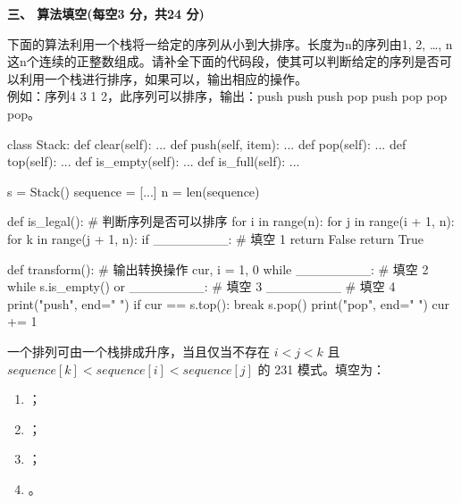 \textbf{三、 算法填空(每空3 分，共24 分)}
\begin{question}
下面的算法利用一个栈将一给定的序列从小到大排序。长度为n的序列由1, 2, …, n这n个连续的正整数组成。请补全下面的代码段，使其可以判断给定的序列是否可以利用一个栈进行排序，如果可以，输出相应的操作。\\
例如：序列4 3 1 2，此序列可以排序，输出：push push push pop push pop pop pop。\\
\begin{pycode}
class Stack:
    def clear(self): ...
    def push(self, item): ...
    def pop(self): ...
    def top(self): ...
    def is_empty(self): ...
    def is_full(self): ...


s = Stack()
sequence = [...]
n = len(sequence)


def is_legal():
    # 判断序列是否可以排序
    for i in range(n):
        for j in range(i + 1, n):
            for k in range(j + 1, n):
                if ________:       # 填空 1
                    return False
    return True


def transform():
    # 输出转换操作
    cur, i = 1, 0
    while ________:                # 填空 2
        while s.is_empty() or ________:    # 填空 3
            ________               # 填空 4
            print("push", end=" ")
            if cur == s.top():
                break
        s.pop()
        print("pop", end=" ")
        cur += 1
\end{pycode}
\begin{solution}
一个排列可由一个栈排成升序，当且仅当不存在 $i<j<k$ 且 $sequence[k]<sequence[i]<sequence[j]$ 的 231 模式。填空为：
  \begin{enumerate}[leftmargin=2em]
    \item \texttt{}；
    \item \texttt{}；
    \item \texttt{}；
    \item \texttt{}。
  \end{enumerate}
\end{solution}
\end{question}

